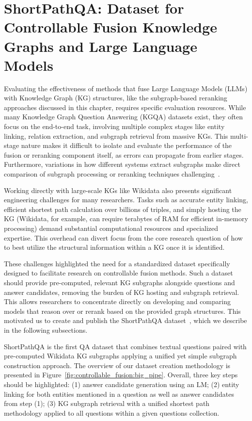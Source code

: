 \section{ShortPathQA: Dataset for Controllable Fusion Knowledge Graphs and Large Language Models}
\label{sec:controllable_fusion:dataset}

Evaluating the effectiveness of methods that fuse Large Language Models (LLMs) with Knowledge Graph (KG) structures, like the subgraph-based reranking approaches discussed in this chapter, requires specific evaluation resources. While many Knowledge Graph Question Answering (KGQA) datasets exist, they often focus on the end-to-end task, involving multiple complex stages like entity linking, relation extraction, and subgraph retrieval from massive KGs. This multi-stage nature makes it difficult to isolate and evaluate the performance of the fusion or reranking component itself, as errors can propagate from earlier stages. Furthermore, variations in how different systems extract subgraphs make direct comparison of subgraph processing or reranking techniques challenging~\cite{DBLP:conf/nldb/SalnikovSPQA25}.

Working directly with large-scale KGs like Wikidata also presents significant engineering challenges for many researchers. Tasks such as accurate entity linking, efficient shortest path calculation over billions of triples, and simply hosting the KG (Wikidata, for example, can require terabytes of RAM for efficient in-memory processing) demand substantial computational resources and specialized expertise. This overhead can divert focus from the core research question of how to best utilize the structural information within a KG once it is identified.

These challenges highlighted the need for a standardized dataset specifically designed to facilitate research on controllable fusion methods. Such a dataset should provide pre-computed, relevant KG subgraphs alongside questions and answer candidates, removing the burden of KG hosting and subgraph retrieval. This allows researchers to concentrate directly on developing and comparing models that reason over or rerank based on the provided graph structures. This motivated us to create and publish the ShortPathQA dataset~\cite{DBLP:conf/nldb/SalnikovSPQA25}, which we describe in the following subsections.

ShortPathQA is the first QA dataset that combines textual questions paired with pre-computed Wikidata KG subgraphs applying a unified yet simple subgraph construction approach. The overview of our dataset creation methodology is presented in Figure~\ref{fig:controllable_fusion:big_pipe}. Overall, three key steps should be highlighted: (1) answer candidate generation using an LM; (2) entity linking for both entities mentioned in a question as well as answer candidates from step (1); (3) KG subgraph retrieval with a unified shortest path methodology applied to all questions within a given questions collection.

